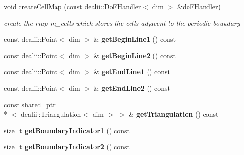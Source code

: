 \begin{DoxyCompactItemize}
\item 
void \hyperlink{classnatrium_1_1PeriodicBoundary_a233d460baa307b13bc32efb57c07f7c5}{create\-Cell\-Map} (const dealii\-::\-Do\-F\-Handler$<$ dim $>$ \&do\-F\-Handler)
\begin{DoxyCompactList}\small\item\em create the map m\-\_\-cells which stores the cells adjacent to the periodic boundary \end{DoxyCompactList}\item 
\hypertarget{classnatrium_1_1PeriodicBoundary_a65ae8204075b82c9bec0c3228a1a64b4}{const dealii\-::\-Point$<$ dim $>$ \& {\bfseries get\-Begin\-Line1} () const }\label{classnatrium_1_1PeriodicBoundary_a65ae8204075b82c9bec0c3228a1a64b4}

\item 
\hypertarget{classnatrium_1_1PeriodicBoundary_a4df4b764f1e5e083d783cca4d47e6f4e}{const dealii\-::\-Point$<$ dim $>$ \& {\bfseries get\-Begin\-Line2} () const }\label{classnatrium_1_1PeriodicBoundary_a4df4b764f1e5e083d783cca4d47e6f4e}

\item 
\hypertarget{classnatrium_1_1PeriodicBoundary_ab3b83fa783008a541163e2f5c88c6559}{const dealii\-::\-Point$<$ dim $>$ \& {\bfseries get\-End\-Line1} () const }\label{classnatrium_1_1PeriodicBoundary_ab3b83fa783008a541163e2f5c88c6559}

\item 
\hypertarget{classnatrium_1_1PeriodicBoundary_a882ea84b3f9a6367f295f8236cd75686}{const dealii\-::\-Point$<$ dim $>$ \& {\bfseries get\-End\-Line2} () const }\label{classnatrium_1_1PeriodicBoundary_a882ea84b3f9a6367f295f8236cd75686}

\item 
\hypertarget{classnatrium_1_1PeriodicBoundary_a5754ea62416bc8c1149c059f3b05d5ad}{const shared\-\_\-ptr\\*
$<$ dealii\-::\-Triangulation$<$ dim $>$ $>$ \& {\bfseries get\-Triangulation} () const }\label{classnatrium_1_1PeriodicBoundary_a5754ea62416bc8c1149c059f3b05d5ad}

\item 
\hypertarget{classnatrium_1_1PeriodicBoundary_aead325214d43693a03a5d24613f4fe14}{size\-\_\-t {\bfseries get\-Boundary\-Indicator1} () const }\label{classnatrium_1_1PeriodicBoundary_aead325214d43693a03a5d24613f4fe14}

\item 
\hypertarget{classnatrium_1_1PeriodicBoundary_af7e6f5b6028b0499df8335377156bc26}{size\-\_\-t {\bfseries get\-Boundary\-Indicator2} () const }\label{classnatrium_1_1PeriodicBoundary_af7e6f5b6028b0499df8335377156bc26}


\end{DoxyCompactItemize}
